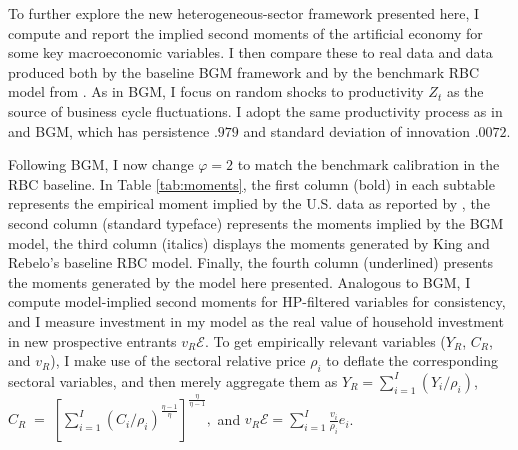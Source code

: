 \documentclass[a4paper,12pt]{article} %
\numberwithin{equation}{section} %
\numberwithin{figure}{section}
\numberwithin{table}{section}
\begin{document}
To further explore the new heterogeneous-sector framework presented here, I compute and report the implied second
moments of the artificial economy for some key macroeconomic variables. I then compare these to real data and data produced
both by the baseline BGM framework and by the benchmark RBC model from \textcite{king1999resuscitating}. As in BGM,
I focus on random shocks to productivity $Z_t$ as the source of business cycle fluctuations. I adopt the same
productivity process as in \textcite{king1999resuscitating} and BGM, which has persistence $.979$ and standard deviation
of innovation $.0072$.

Following BGM, I now change $\varphi = 2$ to match the benchmark calibration in
the RBC baseline. In Table \ref{tab:moments}, the first column (bold) in each subtable represents the empirical
moment implied by the U.S. data as reported by \textcite{king1999resuscitating}, the second column (standard typeface) 
represents the moments implied by the BGM model, the third column (italics) displays the moments
generated by King and Rebelo’s baseline RBC model. Finally, the fourth column (underlined) presents the moments
generated by the model here presented. Analogous to BGM, I compute model-implied second moments for HP-filtered 
variables for consistency, and I measure investment in my model 
as the real value of household investment in new prospective entrants $v_R \mathcal{E}$. To get empirically relevant
variables ($Y_R$, $C_R$, and $v_R$), I make use of the sectoral relative price $\rho_i$ to deflate the corresponding sectoral variables,
and then merely aggregate them as $Y_R = \sum_{i=1}^I(Y_i/\rho_i)$, $C_R\;=\; 
\left[ \sum_{i=1}^I \left( C_{i}/\rho_i \right)^{\frac{\eta-1}{\eta}} \right]^{\frac{\eta}{\eta-1}},$ 
and $v_R\mathcal{E}=\sum_{i=1}^I\frac{v_{i}}{\rho_i}e_{i}$. 
\end{document}
